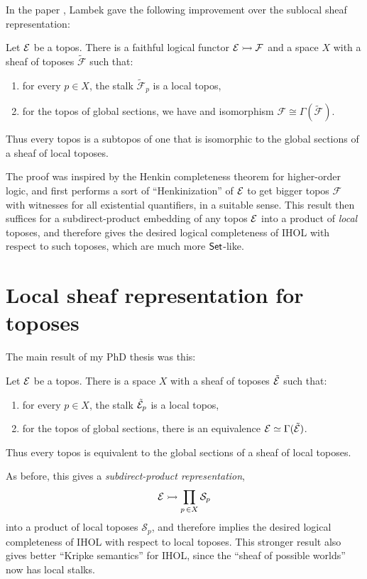 \documentclass[lambek.tex]{subfiles}
\begin{document}
In the paper \cite{Lambeck1988}, Lambek gave the following improvement over the sublocal sheaf representation:

\begin{theorem}[Lambek 1989]
Let $\mathcal{E}$ be a topos.  
There is a faithful logical functor $\mathcal{E}\rightarrowtail\mathcal{F}$ 
and a space $X$ with a sheaf of toposes 
$\tilde{\mathcal{F}}$ such that:
\begin{enumerate}
\item for every $p\in X$, the stalk $\tilde{\mathcal{F}}_p$ is a  local topos, 
\item for the topos of global sections, we have and isomorphism $\mathcal{F} \cong \Gamma(\tilde{\mathcal{F}}) $.
\end{enumerate}
Thus every topos is a  subtopos of one that is isomorphic to the global sections of a sheaf of  local toposes.  
\end{theorem}
\medskip
%
The proof was inspired by the Henkin completeness theorem for higher-order logic, and first performs a sort of ``Henkinization'' of $\mathcal{E}$ to get bigger topos $\mathcal{F}$ with witnesses for all existential quantifiers, in a suitable sense. This result then suffices for a subdirect-product embedding of any topos $\mathcal{E}$ into a product of \emph{local} toposes, and therefore gives the desired logical completeness of IHOL with respect to such toposes, which are much more $\mathsf{Set}$-like.

\section{Local sheaf representation for toposes}\label{section:localtopos}

The main result of my PhD thesis \cite{A1998} was this:
\begin{theorem}\label{theorem:local}
Let $\mathcal{E}$ be a topos.  
There is a space $X$ with a sheaf of toposes $\tilde{\mathcal{E}}$ such that:
\begin{enumerate}
\item for every $p\in X$, the stalk $\tilde{\mathcal{E}}_p$ is a local topos, 
\item for the topos of global sections,  there is an equivalence $\mathcal{E}\simeq \Gamma(\tilde{\mathcal{E}})$.
\end{enumerate}
Thus every topos is equivalent to the global sections of a sheaf of local toposes.  
\end{theorem}

As before, this gives a \emph{subdirect-product representation},
\[
\mathcal{E} \rightarrowtail \prod_{p\,\in X}\mathcal{S}_p
\]
into a product of local toposes $\mathcal{S}_p$, and therefore implies the desired logical completeness of IHOL with respect to local toposes.  
This stronger result also gives better ``Kripke semantics'' for IHOL, since the ``sheaf of possible worlds'' now has local stalks.
\medskip
\end{document}
